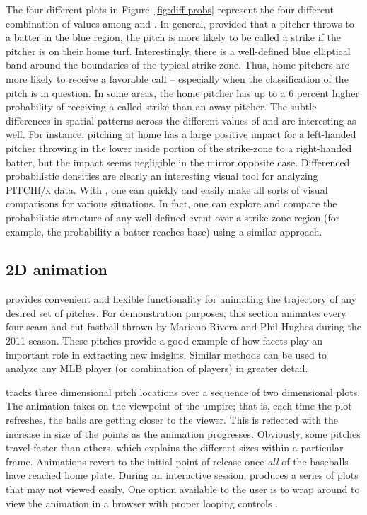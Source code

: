 \begin{article}
The four different plots in Figure~\ref{fig:diff-probs} represent
the four different combination of values among  and
. In general, provided that a pitcher throws to a batter
in the blue region, the pitch is more likely to be called a strike
if the pitcher is on their home turf. Interestingly, there is a well-defined
blue elliptical band around the boundaries of the typical strike-zone.
Thus, home pitchers are more likely to receive a favorable call --
especially when the classification of the pitch is in question. In
some areas, the home pitcher has up to a 6 percent higher probability
of receiving a called strike than an away pitcher. The subtle differences
in spatial patterns across the different values of 
and  are interesting as well. For instance, pitching
at home has a large positive impact for a left-handed pitcher throwing
in the lower inside portion of the strike-zone to a right-handed batter,
but the impact seems negligible in the mirror opposite case.
Differenced probabilistic densities are clearly an interesting visual
tool for analyzing PITCHf/x data. With , one can quickly
and easily make all sorts of visual comparisons for various situations.
In fact, one can explore and compare the probabilistic structure of
any well-defined event over a strike-zone region (for example, the
probability a batter reaches base) using a similar approach. 


\subsection{2D animation}

 provides convenient and flexible functionality for
animating the trajectory of any desired set of pitches. For demonstration
purposes, this section animates every four-seam and cut fastball thrown
by Mariano Rivera and Phil Hughes during the 2011 season. These pitches
provide a good example of how facets play an important role in extracting
new insights. Similar methods can be used to analyze any MLB player
(or combination of players) in greater detail.

 tracks three dimensional pitch locations over a
sequence of two dimensional plots. The animation takes on the viewpoint
of the umpire; that is, each time the plot refreshes, the balls are
getting closer to the viewer. This is reflected with the increase
in size of the points as the animation progresses. Obviously, some
pitches travel faster than others, which explains the different sizes
within a particular frame. Animations revert to the initial point
of release once \emph{all} of the baseballs have reached home plate.
During an interactive session,  produces a series
of plots that may not viewed easily. One option available to the user
is to wrap  around  to
view the animation in a browser with proper looping controls \citep{animation}.


\end{article}
